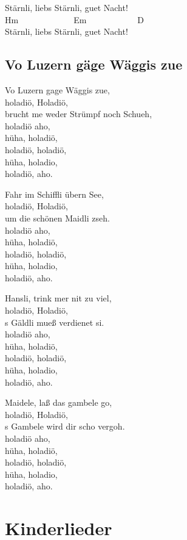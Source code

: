 \documentclass[
  letterpaper,
]{scrbook}
\begin{document}
Stärnli, liebs Stärnli, guet Nacht!\\
Hm~~~~~~~~~~~~~Em~~~~~~~~~~~~D\\
Stärnli, liebs Stärnli, guet Nacht!

\hypertarget{vo-luzern-guxe4ge-wuxe4ggis-zue}{%
\chapter{Vo Luzern gäge Wäggis
zue}\label{vo-luzern-guxe4ge-wuxe4ggis-zue}}

Vo Luzern gage Wäggis zue,\\
holadiö, Holadiö,\\
brucht me weder Strümpf noch Schueh,\\
holadiö aho,\\
hüha, holadiö,\\
holadiö, holadiö,\\
hüha, holadio,\\
holadiö, aho.

Fahr im Schiffli übern See,\\
holadiö, Holadiö,\\
um die schönen Maidli zseh.\\
holadiö aho,\\
hüha, holadiö,\\
holadiö, holadiö,\\
hüha, holadio,\\
holadiö, aho.

Hansli, trink mer nit zu viel,\\
holadiö, Holadiö,\\
\textquotesingle s Gäldli mueß verdienet si.\\
holadiö aho,\\
hüha, holadiö,\\
holadiö, holadiö,\\
hüha, holadio,\\
holadiö, aho.

Maidele, laß das gambele go,\\
holadiö, Holadiö,\\
\textquotesingle s Gambele wird dir scho vergoh.\\
holadiö aho,\\
hüha, holadiö,\\
holadiö, holadiö,\\
hüha, holadio,\\
holadiö, aho.

\part{Kinderlieder}
\end{document}
